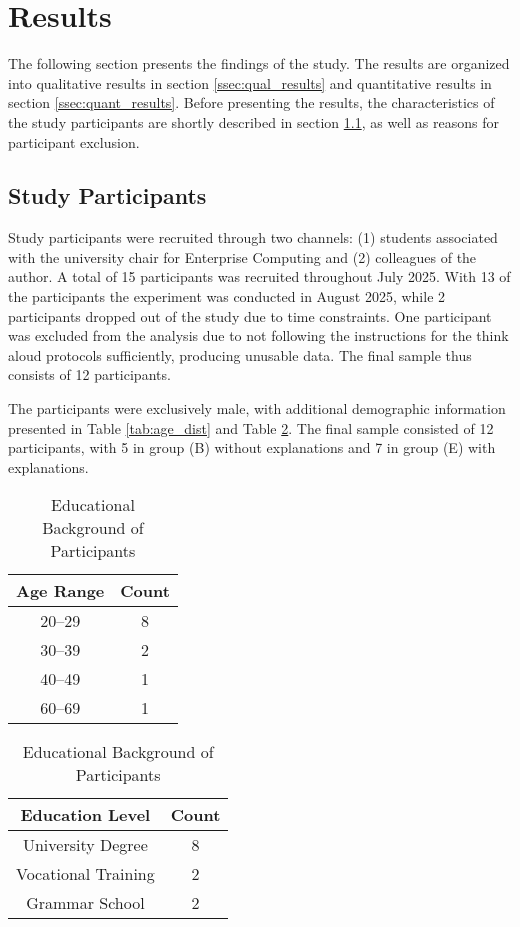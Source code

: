 \section{Results} \label{sec:results}

The following section presents the findings of the study. The results are organized into qualitative results in section \ref{ssec:qual_results} and quantitative results in section \ref{ssec:quant_results}. Before presenting the results, the characteristics of the study participants are shortly described in section \ref{ssec:study_participants}, as well as reasons for participant exclusion.

\subsection{Study Participants} \label{ssec:study_participants}

Study participants were recruited through two channels: (1) students associated with the university chair for Enterprise Computing and (2) colleagues of the author. A total of 15 participants was recruited throughout July 2025. With 13 of the participants the experiment was conducted in August 2025, while 2 participants dropped out of the study due to time constraints. One participant was excluded from the analysis due to not following the instructions for the think aloud protocols sufficiently, producing unusable data. The final sample thus consists of 12 participants.

The participants were exclusively male, with additional demographic information presented in Table \ref{tab:age_dist} and Table \ref{tab:edu_bg}. The final sample consisted of 12 participants, with 5 in group (B) without explanations and 7 in group (E) with explanations.

\begingroup
\tablespacing

\begin{table}[ht]
    \parbox{.45\linewidth}{
        \centering
        \begin{tabular}{cc}
            Age Range & Count \\
            \hline
            20--29 & 8 \\
            30--39 & 2 \\
            40--49 & 1 \\
            60--69 & 1
        \end{tabular}
        \caption{Age Distribution of Participants}
        \label{tab:age_dist}
    }
    \hfill
    \parbox{.45\linewidth}{
        \begin{tabular}{cc}
            Education Level & Count \\
            \hline
            University Degree & 8 \\
            Vocational Training & 2 \\
            Grammar School & 2
        \end{tabular}
        \caption{Educational Background of Participants}
        \label{tab:edu_bg}
    }
\end{table}

